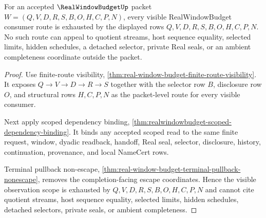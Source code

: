 \begin{theorem}
\label{thm:real-window-budget-observation-scope-exhaustion}
For an accepted $\RealWindowBudgetUp$ packet $W=(Q,V,D,R,S,B,O,H,C,P,N)$, every
visible RealWindowBudget consumer route is exhausted by the displayed rows
$Q,V,D,R,S,B,O,H,C,P,N$. No such route can appeal to quotient streams, host
sequence equality, selected limits, hidden schedules, a detached selector,
private Real seals, or an ambient completeness coordinate outside the packet.
\end{theorem}
\begin{proof}
Use finite-route visibility,
\autoref{thm:real-window-budget-finite-route-visibility}. It exposes
$Q \to V \to D \to R \to S$ together with the selector row $B$, disclosure row
$O$, and structural rows $H,C,P,N$ as the packet-level route for every visible
consumer.

Next apply scoped dependency binding,
\autoref{thm:realwindowbudget-scoped-dependency-binding}. It binds any accepted
scoped read to the same finite request, window, dyadic readback, handoff, Real
seal, selector, disclosure, history, continuation, provenance, and local
NameCert rows.

Terminal pullback non-escape,
\autoref{thm:real-window-budget-terminal-pullback-nonescape}, removes the
completion-facing escape coordinates. Hence the visible observation scope is
exhausted by $Q,V,D,R,S,B,O,H,C,P,N$ and cannot cite quotient streams, host
sequence equality, selected limits, hidden schedules, detached selectors,
private seals, or ambient completeness.
\end{proof}

